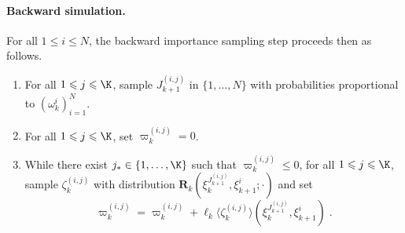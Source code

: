 \documentclass{article}
\newcommand{\N}{N}
\newcommand{\eqsp}{\;}
\newcommand{\epart}[2]{\ensuremath{\xi_{#1}^{#2}}}
\newcommand{\kernelmarg}{\mathbf{R}}
\newcommand{\hatqg}[1]{\mathsf{\ell}_{#1}}
\begin{document}
\paragraph{Backward simulation.} For all $1\leqslant i\leqslant \N$, the backward importance sampling step proceeds then as follows.
\begin{enumerate}
\item For all $1\leqslant j\leqslant \K$,   sample $J_{k+1}^{(i,j)}$ in $\{1,\ldots, \N\}$ with probabilities proportional to  $(\omega^{i}_k)_{i=1}^{\N}$. 
\item For all $1\leqslant j\leqslant \K$, set  $\varpi_k^{(i,j)}= 0$.
\item While there exist $j_* \in\{1,\ldots,\K\}$ such that $\varpi_k^{(i,j)} \leqslant 0$, for all $1\leqslant j\leqslant \K$, sample $\zeta_k^{(i,j)}$  with distribution $\kernelmarg_{k}(\epart{k}{J_{k+1}^{(i,j)}}, \epart{k+1}{i};\cdot)$ and set 
$$
\varpi_k^{(i,j)} = \varpi_k^{(i,j)} +  \hatqg{k}\langle \zeta_k^{(i,j)} \rangle(\epart{k}{J_{k+1}^{(i,j)}}, \epart{k+1}{i})\eqsp.
$$
\end{enumerate}
\end{document}
